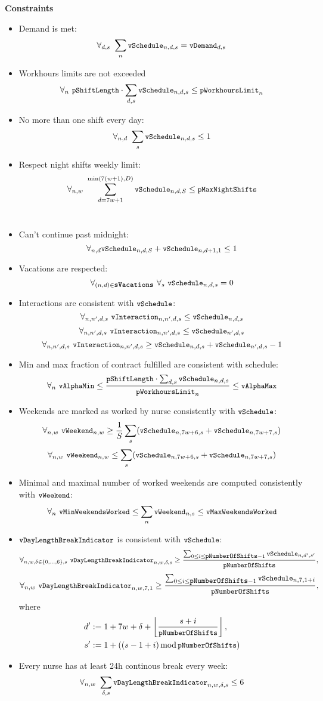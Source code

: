 \noindent\textbf{Constraints}
\begin{itemize}
    \item Demand is met:
    \[ \forall_{d,s}\ \sum_n \texttt{\small vSchedule}_{n,d,s} = \texttt{\small vDemand}_{d, s} \]
    \item Workhours limits are not exceeded
    \[ \forall_{n}\ \texttt{\small pShiftLength}\cdot\sum_{d, s} \texttt{\small vSchedule}_{n,d,s} \leq \texttt{\small pWorkhoursLimit}_n \]
    \item No more than one shift every day:
    \[ \forall_{n,d}\ \sum_s \texttt{\small vSchedule}_{n,d,s} \leq 1 \]
    \item Respect night shifts weekly limit:
    \[ \forall_{n,w}\ \sum_{d=7w+1}^{\min(7(w+1), D)} \texttt{\small vSchedule}_{n,d,S} \leq \texttt{\small pMaxNightShifts} \] \\
    \item Can't continue past midnight:
    \[ \forall_{n,d} \texttt{\small vSchedule}_{n,d,S} + \texttt{\small vSchedule}_{n,d+1,1} \leq 1 \]
    \item Vacations are respected:
    \[ \forall_{(n,d)\in \sVacations}\ \forall_s\ \vSchedule_{n,d,s} = 0 \]
    \item Interactions are consistent with $\texttt{\small vSchedule}$: 
    \[ \forall_{n,n',d,s}\ \texttt{\small vInteraction}_{n,n',d,s} \leq \texttt{\small vSchedule}_{n,d,s} \]
    \[ \forall_{n,n',d,s}\ \texttt{\small vInteraction}_{n,n',d,s} \leq \texttt{\small vSchedule}_{n',d,s} \]
    \[ \forall_{n,n',d,s}\ \texttt{\small vInteraction}_{n,n',d,s} \geq \texttt{\small vSchedule}_{n,d,s} + \texttt{\small vSchedule}_{n',d,s} - 1 \]
    \item Min and max fraction of contract fulfilled are consistent with schedule:
    \[ \forall_{n}\ \texttt{\small vAlphaMin} \leq \frac{\texttt{\small pShiftLength} \cdot \sum_{d,s} \texttt{\small vSchedule}_{n,d,s}}{\texttt{\small pWorkhoursLimit}_n} \leq \texttt{\small vAlphaMax} \]
    \item Weekends are marked as worked by nurse consistently with $\texttt{\small vSchedule}$: 
    \[ \forall_{n, w}\ \texttt{\small vWeekend}_{n, w} \geq \frac{1}{S}\sum_s (\texttt{\small vSchedule}_{n, 7w+6, s} + \texttt{\small vSchedule}_{n, 7w+7, s}) \]
    \[ \forall_{n, w}\ \texttt{\small vWeekend}_{n, w} \leq \sum_s (\texttt{\small vSchedule}_{n, 7w+6, s} + \texttt{\small vSchedule}_{n, 7w+7, s}) \]
    \item Minimal and maximal number of worked weekends are computed consistently with $\texttt{\small vWeekend}$:
    \[ \forall_{n}\ \texttt{\small vMinWeekendsWorked} \le \sum_n \texttt{\small vWeekend}_{n, s} \le \texttt{\small vMaxWeekendsWorked} \]
    \item $\texttt{\small vDayLengthBreakIndicator}$ is consistent with $\texttt{\small vSchedule}$:
    \[ \forall_{n,w,\delta  \in \{0, \dots, 6\},s}\ \vDayLengthBreakIndicator_{n, w, \delta, s} \ge \frac{\sum_{0 \le i \le \pNumberOfShifts - 1} \vSchedule_{n, d', s'}}{\pNumberOfShifts}, \]
    \[ \forall_{n,w}\ \texttt{\small vDayLengthBreakIndicator}_{n, w, 7, 1} \ge \frac{\sum_{0 \le i \le \texttt{\small pNumberOfShifts} - 1} \texttt{\small vSchedule}_{n, 7, 1 + i}}{\texttt{\small pNumberOfShifts}}, \]
    where
    \begin{align*}
        d' &:= 1+7w+\delta+\left\lfloor\frac{s+i}{\texttt{\small pNumberOfShifts}}\right\rfloor, \\
        s' &:= 1 + ((s - 1 + i) \operatorname{mod} \texttt{\small pNumberOfShifts})
    \end{align*}
    \item Every nurse has at least 24h continous break every week:
    \[ \forall_{n, w}\ \sum_{\delta, s} \texttt{\small vDayLengthBreakIndicator}_{n, w, \delta, s} \le 6 \]
\end{itemize}

